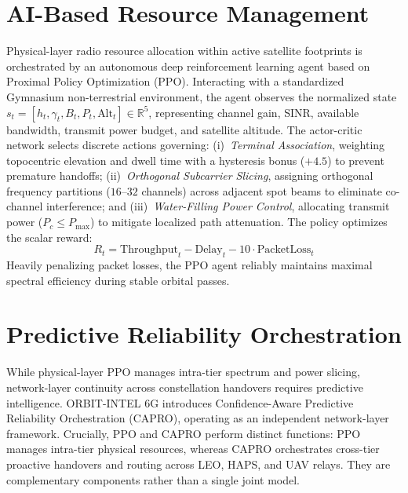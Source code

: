\documentclass[a4paper]{article}
\begin{document}
\section{AI-Based Resource Management}
Physical-layer radio resource allocation within active satellite footprints is orchestrated by an autonomous deep reinforcement learning agent based on Proximal Policy Optimization (PPO). Interacting with a standardized Gymnasium non-terrestrial environment, the agent observes the normalized state $s_t = [h_t, \gamma_t, B_t, P_t, \text{Alt}_t] \in \mathbb{R}^5$, representing channel gain, SINR, available bandwidth, transmit power budget, and satellite altitude. The actor-critic network selects discrete actions governing: (i)~\textit{Terminal Association}, weighting topocentric elevation and dwell time with a hysteresis bonus ($+4.5$) to prevent premature handoffs; (ii)~\textit{Orthogonal Subcarrier Slicing}, assigning orthogonal frequency partitions ($16\text{--}32$ channels) across adjacent spot beams to eliminate co-channel interference; and (iii)~\textit{Water-Filling Power Control}, allocating transmit power ($P_c \le P_{\max}$) to mitigate localized path attenuation. The policy optimizes the scalar reward:
\begin{equation}
  R_t = \text{Throughput}_t - \text{Delay}_t - 10 \cdot \text{PacketLoss}_t
\end{equation}
Heavily penalizing packet losses, the PPO agent reliably maintains maximal spectral efficiency during stable orbital passes.

\section{Predictive Reliability Orchestration}
While physical-layer PPO manages intra-tier spectrum and power slicing, network-layer continuity across constellation handovers requires predictive intelligence. ORBIT-INTEL 6G introduces Confidence-Aware Predictive Reliability Orchestration (CAPRO), operating as an independent network-layer framework. Crucially, PPO and CAPRO perform distinct functions: PPO manages intra-tier physical resources, whereas CAPRO orchestrates cross-tier proactive handovers and routing across LEO, HAPS, and UAV relays. They are complementary components rather than a single joint model.
\end{document}
